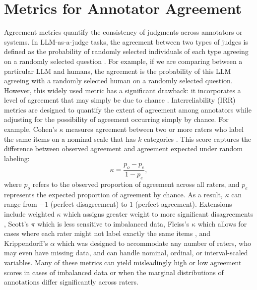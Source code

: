 \documentclass{article}
\begin{document}
\section{Metrics for Annotator Agreement} \label{sec:metrics_for_annotators}

Agreement metrics quantify the consistency of judgments across annotators or systems. In LLM-as-a-judge tasks, the agreement between two types of judges is defined as the probability of randomly selected individuals of each type agreeing on a randomly selected question \cite{zheng2023judging}. For example, if we are comparing between a particular LLM and humans, the agreement is the probability of this LLM agreeing with a randomly selected human on a randomly selected question. However, this widely used metric has a significant drawback: it incorporates a level of agreement that may simply be due to chance \cite{cohenWeightedKappaNominal1968}. Interreliability (IRR) metrics are designed to quantify the extent of agreement among annotators while adjusting for the possibility of agreement occurring simply by chance. For example, Cohen’s $\kappa$ measures agreement between two or more raters who label the same items on a nominal scale that has $k$ categories \cite{doi:10.1177/001316446002000104}. This score captures the difference between observed agreement and agreement expected under random labeling:
\[
\kappa = \frac{p_o - p_e}{1 - p_e},
\]
where $p_o$ refers to the observed proportion of agreement across all raters, and $p_e$ represents the expected proportion of agreement by chance. As a result, $\kappa$ can range from $-1$ (perfect disagreement) to $1$ (perfect agreement). Extensions include weighted $\kappa$ which assigns greater weight to more significant disagreements \cite{cohenWeightedKappaNominal1968}, Scott’s $\pi$ which is less sensitive to imbalanced data, Fleiss’s $\kappa$ which allows for cases where each rater might not label exactly the same items \cite{fleiss1971}, and Krippendorff’s $\alpha$ which was designed to accommodate any number of raters, who may even have missing data, and can handle nominal, ordinal, or interval-scaled variables. Many of these metrics can yield misleadingly high or low agreement scores in cases of imbalanced data or when the marginal distributions of annotations differ significantly across raters.
\end{document}
